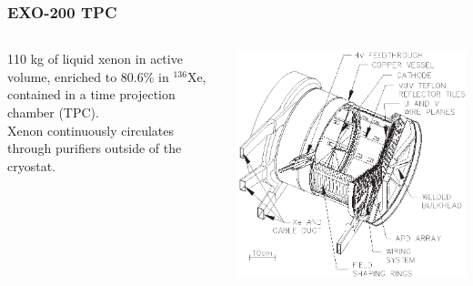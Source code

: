 \documentclass{beamer}
\begin{document}
\begin{frame}
\begin{center}
\frametitle{EXO-200 TPC}
\end{center}
\vspace{1cm}
\begin{columns}[onlytextwidth]
\begin{column}{.25\textwidth}
110 kg of liquid xenon in active volume, enriched to 80.6\% in $^{136}$Xe, contained in a time projection chamber (TPC).\\[\baselineskip]
Xenon continuously circulates through purifiers outside of the cryostat.
\end{column}
\begin{column}{.75\textwidth}
\includegraphics[keepaspectratio=true,width=\textwidth]{TPCSchematic.eps}
\end{column}
\end{columns}
\end{frame}
\end{document}
